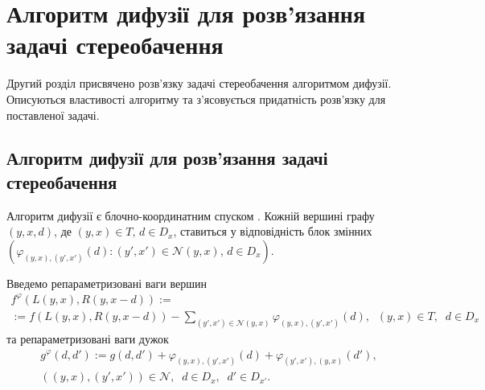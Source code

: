\chapter{Алгоритм дифузії для розв'язання задачі стереобачення}

Другий розділ присвячено розв'язку задачі стереобачення алгоритмом дифузії.
Описуються властивості алгоритму та з'ясовується придатність
розв'язку для поставленої задачі.

\section{Алгоритм дифузії для розв'язання задачі стереобачення}

Алгоритм дифузії є блочно-координатним спуском
\cite{overview:savchynskyy:diffusion}.
Кожній вершині графу $\left( y, x, d \right)$,
де $\left(y, x \right) \in T, \, d \in D_x$,
ставиться у відповідність блок змінних
$\left(
    \varphi_{\left(y, x \right), \left(y', x' \right)} \left(d \right) :
    \left(y', x' \right) \in \mathcal{N} \left(y, x \right), \,
    d \in D_x
\right)$.

Введемо репараметризовані ваги вершин
\begin{equation*}
\begin{split}
    f^{\varphi}\left(L \left(y, x\right) , R \left(y, x - d\right)\right) := \\
    := f \left(L \left(y, x\right) , R \left(y, x - d\right)\right)
    - \sum \limits_{\left(y', x' \right) \in \mathcal{N} \left(y, x \right)}
        \varphi_{\left(y, x \right), \left(y', x' \right)} \left(d \right), \; \;
    \left(y, x \right) \in T, \; \;
    d \in D_x
\end{split}
\end{equation*}
та репараметризовані ваги дужок
\begin{equation*}
\begin{split}
    g^{\varphi} \left(d, d' \right)
    := g \left(d, d' \right)
    + \varphi_{\left(y, x \right), \left(y', x' \right)} \left(d \right)
    + \varphi_{\left(y', x' \right), \left(y, x \right)} \left(d' \right), \\
    \left( \left(y, x \right), \left(y', x' \right) \right) \in \mathcal{N}, \; \;
    d \in D_x, \; \;
    d' \in D_{x'}.
\end{split}
\end{equation*}

